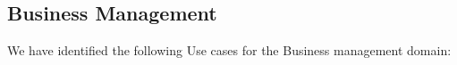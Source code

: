 \documentclass[]{VUMIFTemplateClass}
\begin{document}
\subsection{Business Management}




We have identified the following Use cases for the Business management domain:
\end{document}
